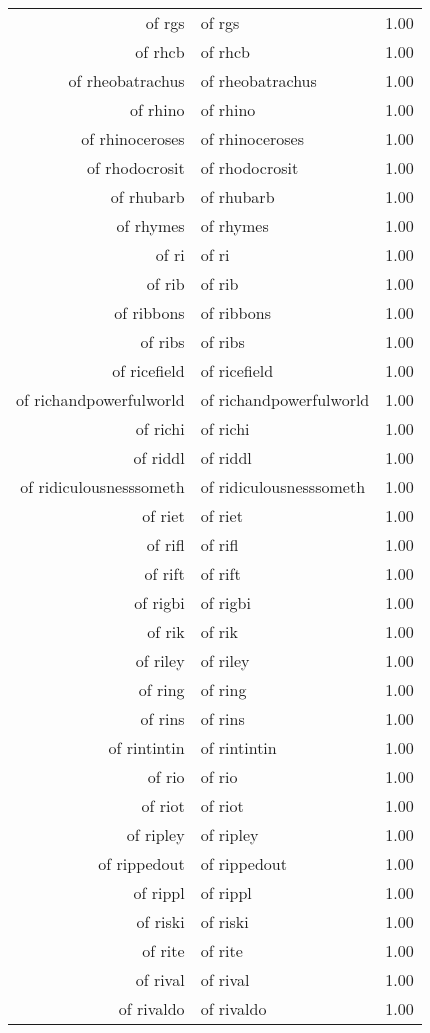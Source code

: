 \begin{table}[ht]
\begin{tabular}{rlr}
  of rgs & of rgs & 1.00 \\ 
  of rhcb & of rhcb & 1.00 \\ 
  of rheobatrachus & of rheobatrachus & 1.00 \\ 
  of rhino & of rhino & 1.00 \\ 
  of rhinoceroses & of rhinoceroses & 1.00 \\ 
  of rhodocrosit & of rhodocrosit & 1.00 \\ 
  of rhubarb & of rhubarb & 1.00 \\ 
  of rhymes & of rhymes & 1.00 \\ 
  of ri & of ri & 1.00 \\ 
  of rib & of rib & 1.00 \\ 
  of ribbons & of ribbons & 1.00 \\ 
  of ribs & of ribs & 1.00 \\ 
  of ricefield & of ricefield & 1.00 \\ 
  of richandpowerfulworld & of richandpowerfulworld & 1.00 \\ 
  of richi & of richi & 1.00 \\ 
  of riddl & of riddl & 1.00 \\ 
  of ridiculousnesssometh & of ridiculousnesssometh & 1.00 \\ 
  of riet & of riet & 1.00 \\ 
  of rifl & of rifl & 1.00 \\ 
  of rift & of rift & 1.00 \\ 
  of rigbi & of rigbi & 1.00 \\ 
  of rik & of rik & 1.00 \\ 
  of riley & of riley & 1.00 \\ 
  of ring & of ring & 1.00 \\ 
  of rins & of rins & 1.00 \\ 
  of rintintin & of rintintin & 1.00 \\ 
  of rio & of rio & 1.00 \\ 
  of riot & of riot & 1.00 \\ 
  of ripley & of ripley & 1.00 \\ 
  of rippedout & of rippedout & 1.00 \\ 
  of rippl & of rippl & 1.00 \\ 
  of riski & of riski & 1.00 \\ 
  of rite & of rite & 1.00 \\ 
  of rival & of rival & 1.00 \\ 
  of rivaldo & of rivaldo & 1.00 \\ 

\end{tabular}
\end{table}
